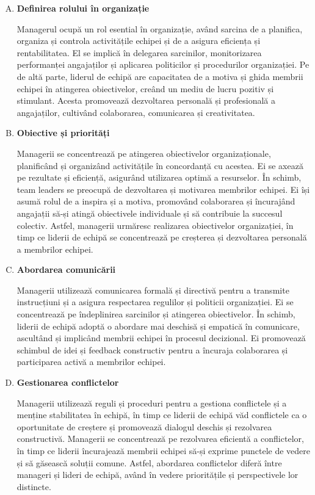 \documentclass[a4paper, 12pt]{article}
\begin{document}
	\begin{enumerate}[A)]

		\item\textbf{Definirea rolului în organizație}
		
		\quad Managerul ocupă un rol esential în organizație, având sarcina de a planifica, organiza și controla activitățile echipei și de a asigura eficiența și rentabilitatea. El se implică în delegarea sarcinilor, monitorizarea performanței angajaților și aplicarea politicilor și procedurilor organizației. Pe de altă parte, liderul de echipă are capacitatea de a motiva și ghida membrii echipei în atingerea obiectivelor, creând un mediu de lucru pozitiv și stimulant. Acesta promovează dezvoltarea personală și profesională a angajaților, cultivând colaborarea, comunicarea și creativitatea.

		\item \textbf{Obiective și priorități}

		\quad\quad Managerii se concentrează pe atingerea obiectivelor organizaționale, planificând și organizând activitățile în concordanță cu acestea. Ei se axează pe rezultate și eficiență, asigurând utilizarea optimă a resurselor. În schimb, team leaders se preocupă de dezvoltarea și motivarea membrilor echipei. Ei își asumă rolul de a inspira și a motiva, promovând colaborarea și încurajând angajații să-și atingă obiectivele individuale și să contribuie la succesul colectiv. Astfel, managerii urmăresc realizarea obiectivelor organizației, în timp ce liderii de echipă se concentrează pe creșterea și dezvoltarea personală a membrilor echipei.

		\item \textbf{Abordarea comunicării}
		
		\quad\quad Managerii utilizează comunicarea formală și directivă pentru a transmite instrucțiuni și a asigura respectarea regulilor și politicii organizației. Ei se concentrează pe îndeplinirea sarcinilor și atingerea obiectivelor. În schimb, liderii de echipă adoptă o abordare mai deschisă și empatică în comunicare, ascultând și implicând membrii echipei în procesul decizional. Ei promovează schimbul de idei și feedback constructiv pentru a încuraja colaborarea și participarea activă a membrilor echipei.

		\item \textbf{Gestionarea conflictelor}

		\quad\quad Managerii utilizează reguli și proceduri pentru a gestiona conflictele și a menține stabilitatea în echipă, în timp ce liderii de echipă văd conflictele ca o oportunitate de creștere și promovează dialogul deschis și rezolvarea constructivă. Managerii se concentrează pe rezolvarea eficientă a conflictelor, în timp ce liderii încurajează membrii echipei să-și exprime punctele de vedere și să găsească soluții comune. Astfel, abordarea conflictelor diferă între manageri și lideri de echipă, având în vedere prioritățile și perspectivele lor distincte.


\end{enumerate}
\end{document}

